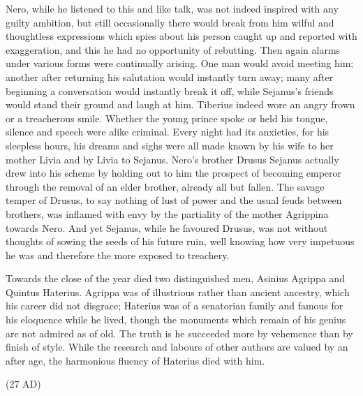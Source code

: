 
Nero, while he listened to this and like talk, was not indeed inspired with any guilty ambition, but still occasionally there would break from him wilful and thoughtless expressions which spies about his person caught up and reported with exaggeration, and this he had no opportunity of rebutting. Then again alarms under various forms were continually arising. One man would avoid meeting him; another after returning his salutation would instantly turn away; many after beginning a conversation would instantly break it off, while Sejanus's friends would stand their ground and laugh at him. Tiberius indeed wore an angry frown or a treacherous smile. Whether the young prince spoke or held his tongue, silence and speech were alike criminal. Every night had its anxieties, for his sleepless hours, his dreams and sighs were all made known by his wife to her mother Livia and by Livia to Sejanus. Nero's brother Drusus Sejanus actually drew into his scheme by holding out to him the prospect of becoming emperor through the removal of an elder brother, already all but fallen. The savage temper of Drusus, to say nothing of lust of power and the usual feuds between brothers, was inflamed with envy by the partiality of the mother Agrippina towards Nero. And yet Sejanus, while he favoured Drusus, was not without thoughts of sowing the seeds of his future ruin, well knowing how very impetuous he was and therefore the more exposed to treachery.


Towards the close of the year died two distinguished men, Asinius Agrippa and Quintus Haterius. Agrippa was of illustrious rather than ancient ancestry, which his career did not disgrace; Haterius was of a senatorian family and famous for his eloquence while he lived, though the monuments which remain of his genius are not admired as of old. The truth is he succeeded more by vehemence than by finish of style. While the research and labours of other authors are valued by an after age, the harmonious fluency of Haterius died with him.


(27 AD)

